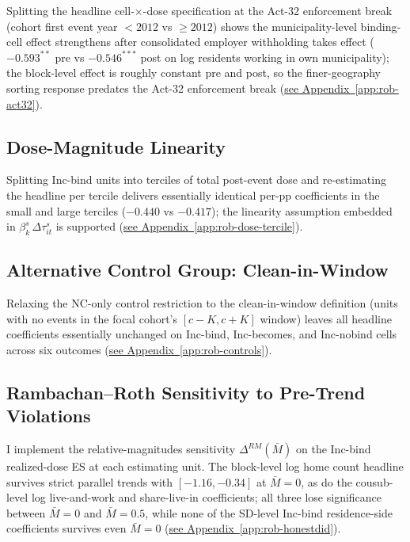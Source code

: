 \documentclass[12pt]{article}
\begin{document}
Splitting the headline cell-$\times$-dose specification at the Act-32
enforcement break (cohort first event year $<2012$ vs $\geq 2012$)
shows the municipality-level binding-cell effect strengthens after
consolidated employer withholding takes effect ($-0.593^{**}$ pre vs
$-0.546^{***}$ post on log residents working in own municipality); the
block-level effect is roughly constant pre and post, so the
finer-geography sorting response predates the Act-32 enforcement
break (\hyperref[app:rob-act32]{see Appendix~\ref{app:rob-act32}}).

\subsection{Dose-Magnitude Linearity}
\label{subsec:rob-dose-tercile}

Splitting Inc-bind units into terciles of total post-event dose and
re-estimating the headline per tercile delivers essentially identical
per-pp coefficients in the small and large terciles ($-0.440$ vs
$-0.417$); the linearity assumption embedded in
$\beta^s_k\,\Delta\tau^s_{it}$ is supported
(\hyperref[app:rob-dose-tercile]{see Appendix~\ref{app:rob-dose-tercile}}).

\subsection{Alternative Control Group: Clean-in-Window}
\label{subsec:rob-controls}

Relaxing the NC-only control restriction to the
\citet{cengizEffectMinimumWages2019a} clean-in-window definition (units
with no events in the focal cohort's $[c-K, c+K]$ window) leaves all
headline coefficients essentially unchanged on Inc-bind, Inc-becomes,
and Inc-nobind cells across six outcomes
(\hyperref[app:rob-controls]{see Appendix~\ref{app:rob-controls}}).

\subsection{Rambachan--Roth Sensitivity to Pre-Trend Violations}
\label{subsec:rob-honestdid}

I implement the \citet{rambachanMoreCredibleApproach2023}
relative-magnitudes sensitivity $\Delta^{RM}(\bar{M})$ on the
Inc-bind realized-dose ES at each estimating unit. The block-level
log home count headline survives strict parallel trends with
$[-1.16, -0.34]$ at $\bar{M}=0$, as do the cousub-level
log live-and-work and share-live-in coefficients; all three lose
significance between $\bar{M}=0$ and $\bar{M}=0.5$, while none of
the SD-level Inc-bind residence-side coefficients survives even
$\bar{M}=0$ (\hyperref[app:rob-honestdid]{see
Appendix~\ref{app:rob-honestdid}}).
\end{document}
